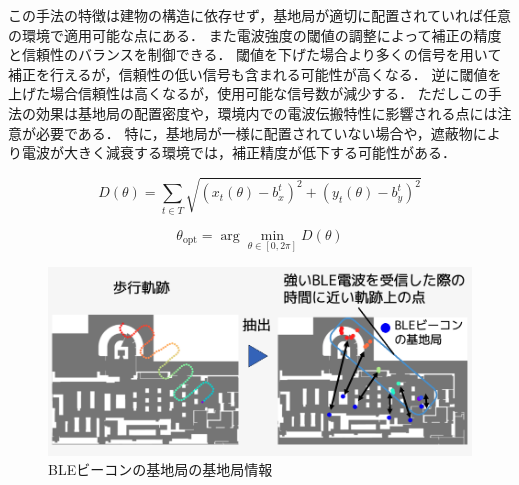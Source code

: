 この手法の特徴は建物の構造に依存せず，基地局が適切に配置されていれば任意の環境で適用可能な点にある．
また電波強度の閾値の調整によって補正の精度と信頼性のバランスを制御できる．
閾値を下げた場合より多くの信号を用いて補正を行えるが，信頼性の低い信号も含まれる可能性が高くなる．
逆に閾値を上げた場合信頼性は高くなるが，使用可能な信号数が減少する．
ただしこの手法の効果は基地局の配置密度や，環境内での電波伝搬特性に影響される点には注意が必要である．
特に，基地局が一様に配置されていない場合や，遮蔽物により電波が大きく減衰する環境では，補正精度が低下する可能性がある．

\begin{equation}
\label{eq:distance_sum}
D(\theta) = \sum_{t\in T} \sqrt{(x_t(\theta) - b^t_x)^2 + (y_t(\theta) - b^t_y)^2}
\end{equation}

\begin{equation}
\label{eq:opt}
\theta_{\mathrm{opt}} = \arg\min_{\theta \in [0, 2\pi]} D(\theta)
\end{equation}

\begin{figure}[H]
	\centering
	\includegraphics[width=\linewidth]{../image/ble-merge.jpg}
	\caption{BLEビーコンの基地局の基地局情報}    \label{fig:ble-merge}
\end{figure}
